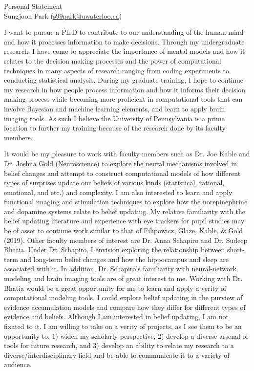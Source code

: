 \documentclass[12pt]{article}
\let\oldcenter\center
\let\oldendcenter\endcenter
\renewenvironment{center}{\setlength\topsep{-1pt}\oldcenter}{\oldendcenter}
\begin{document}
\begin{center}
{\Large Personal Statement} \\
{\normalsize Sungjoon Park (\href{mailto:s99park@uwaterloo.ca}{s99park@uwaterloo.ca})}
\end{center}

I want to pursue a Ph.D to contribute to our understanding of the human mind and how it processes information to make decisions. Through my undergraduate research, I have come to appreciate the importance of mental models and how it relates to the decision making processes and the power of computational techniques in many aspects of research ranging from coding experiments to conducting statistical analysis. During my graduate training, I hope to continue my research in how people process information and how it informs their decision making process while becoming more proficient in computational tools that can involve Bayesian and machine learning elements, and learn to apply brain imaging tools. As such I believe the University of Pennsylvania is a prime location to further my training because of the research done by its faculty members.

It would be my pleasure to work with faculty members such as Dr. Joe Kable and Dr. Joshua Gold (Neuroscience) to explore the neural mechanisms involved in belief changes and attempt to construct computational models of how different types of surprises update our beliefs of various kinds (statistical, rational, emotional, and etc.) and complexity. I am also interested to learn and apply functional imaging and stimulation techniques to explore how the norepinephrine and dopamine systems relate to belief updating. My relative familiarity with the belief updating literature and experience with eye trackers for pupil studies may be of asset to continue work similar to that of Filipowicz, Glaze, Kable, \& Gold (2019). Other faculty members of interest are Dr. Anna Schapiro and Dr. Sudeep Bhatia. Under Dr. Schapiro, I envision exploring the relationship between short-term and long-term belief changes and how the hippocampus and sleep are associated with it. In addition, Dr. Schapiro’s familiarity with neural-network modeling and brain imaging tools are of great interest to me. Working with Dr. Bhatia would be a great opportunity for me to learn and apply a verity of computational modeling tools. I could explore belief updating in the purview of evidence accumulation models and compare how they differ for different types of evidence and beliefs. Although I am interested in belief updating, I am not fixated to it. I am willing to take on a verity of projects, as I see them to be an opportunity to, 1) widen my scholarly perspective, 2) develop a diverse arsenal of tools for future research, and 3) develop an ability to relate my research to a diverse/interdisciplinary field and be able to communicate it to a variety of audience.
\end{document}
